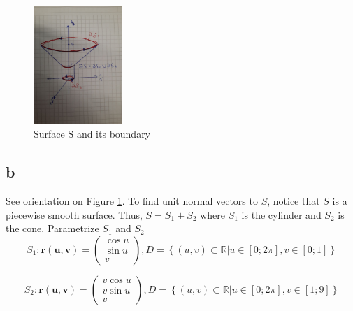 \documentclass{article}
\begin{document}
\begin{figure}[H]
  \centering
  \includegraphics[width=0.3\textwidth]{calculus/W7/img/S}
  \caption{Surface S and its boundary}
  \label{fig:s}
\end{figure}

\subsection{b}
See orientation on Figure \ref{fig:s}. To find unit normal vectors to $S$, notice that $S$ is a piecewise smooth surface. Thus, $S = S_1 + S_2$ where $S_1$ is the cylinder and $S_2$ is the cone. Parametrize $S_1$ and $S_2$
\begin{equation*}
  S_1: \mathbf{r(u, v)} = \begin{pmatrix} \cos u \\ \sin u \\ v  \end{pmatrix}, D = \left\{ (u, v) \subset \mathbb{R} | u \in \left[ 0 ; 2\pi \right], v \in \left[ 0; 1 \right]  \right\}
\end{equation*}

\begin{equation*}
  S_2: \mathbf{r(u, v)} = \begin{pmatrix} v\cos u \\ v\sin u \\ v  \end{pmatrix}, D = \left\{ (u, v) \subset \mathbb{R} | u \in \left[ 0 ; 2\pi \right], v \in \left[ 1; 9 \right]  \right\}
\end{equation*}
\end{document}
